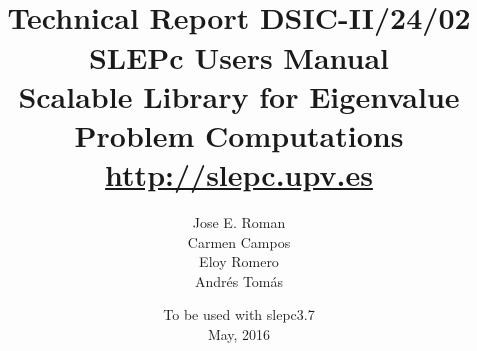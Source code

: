 \documentclass[titlepage,10pt,a4paper]{book}
\newcommand{\slepcversion}{3.7}
\newcommand{\slepchome}{http://slepc.upv.es}
\newcommand{\packnoi}[1]{{\sc #1}\xspace}
\newcommand{\slepc}{\texorpdfstring{\packnoi{slep\rm c}}{{SLEPc}}}
\begin{document}
\title{
 	\vspace*{-1cm}
	\\[2cm]
	\normalsize Technical Report DSIC-II/24/02
	\\[2cm]
	\vspace*{6mm}
	{\Large\bf\sffamily
	SLEPc Users Manual\\[2mm]}
	{\large\bf\sffamily
	Scalable Library for Eigenvalue Problem Computations}\\[2mm]
	\vspace*{6mm}
	\vspace*{6mm}
	\url{\slepchome}
	\\[6mm]
}

\author{
  Jose E. Roman\\
  Carmen Campos\\
  Eloy Romero\\
  Andr\'es Tom\'as\\[3mm]
}

\date{
	To be used with \slepc \slepcversion\\
	May, 2016
}

{
\pagestyle{empty}
\maketitle
}

\setlength{\textheight}{18cm}
\setlength{\oddsidemargin}{0.6cm}
\setlength{\evensidemargin}{0.6cm}
\setlength{\footskip}{2cm}
\setlength{\voffset}{1.3cm}

\pagestyle{empty}
\cleardoublepage
\end{document}

